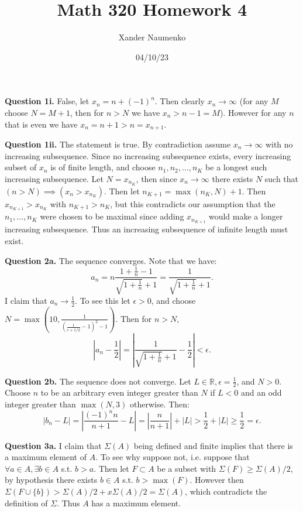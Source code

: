 \documentclass[letterpaper, reqno,11pt]{article}
\begin{document}
\title{Math 320 Homework 4}
\date{04/10/23}
\author{Xander Naumenko}
\maketitle

{\medskip\noindent\bf Question 1i.} False, let $x_n=n+(-1)^{n}$. Then clearly $x_n\to\infty$ (for any $M$ choose $N=M+1$, then for $n>N$ we have $x_n>n-1=M$). However for any $n$ that is even we have $x_n=n+1>n=x_{n+1}$.

{\medskip\noindent\bf Question 1ii.} The statement is true. By contradiction assume $x_n\to \infty$ with no increasing subsequence. Since no increasing subsequence exists, every increasing subset of $x_n$ is of finite length, and choose $n_1,n_2,\ldots,n_K$ be a longest such increasing subsequence. Let $N=x_{n_K}$, then since $x_n\to\infty$ there exists $N$ such that $(n>N)\implies\left( x_n>x_{n_K} \right) $. Then let $n_{K+1}=\max(n_K,N)+1$. Then $x_{n_{K+1}}>x_{n_K}$ with $n_{K+1}>n_K$, but this contradicts our assumption that the $n_1,\ldots,n_K$ were chosen to be maximal since adding $x_{n_{K+1}}$ would make a longer increasing subsequence. Thus an increasing subsequence of infinite length must exist.

\newpage\phantom{blabla}
\newpage

{\medskip\noindent\bf Question 2a.} The sequence converges. Note that we have:
\[
a_{n}=n \frac{1+\frac{1}{n}-1}{\sqrt{1+\frac{1}{n}}+1}=\frac{1}{\sqrt{1+\frac{1}{n}}+1}
.\]
I claim that $a_n\to \frac{1}{2}$. To see this let $\epsilon>0$, and choose $N=\max\left(10,\frac{1}{\left( \frac{1}{\epsilon+1 /2}-1 \right) ^2-1}\right)$. Then for $n>N$,
\[
|a_n-\frac{1}{2}|=\left| \frac{1}{\sqrt{1+\frac{1}{n}}+1} -\frac{1}{2}\right|<\epsilon
.\]

{\medskip\noindent\bf Question 2b.} The sequence does not converge. Let $L\in \mathbb{R},\epsilon=\frac{1}{2}$, and $N>0$. Choose $n$ to be an arbitrary even integer greater than $N$ if $L<0$ and an odd integer greater than $\max(N, 3)$ otherwise. Then:
\[
\left| b_n-L \right| =\left| \frac{(-1)^{n}n}{n+1}-L \right|=\left| \frac{n}{n+1} \right| +|L|> \frac{1}{2}+|L|\geq \frac{1}{2}=\epsilon
.\]

\newpage\phantom{blabla}
\newpage

{\medskip\noindent\bf Question 3a.} I claim that $\Sigma(A)$ being defined and finite implies that there is a maximum element of $A$. To see why suppose not, i.e. suppose that $\forall a\in A, \exists b\in A$ s.t. $b>a$. Then let $F\subset A$ be a subset with $\Sigma(F)\geq \Sigma(A) /2$, by hypothesis there exists $b\in A$ s.t. $b>\max(F)$. However then $\Sigma(F\cup \{b\})> \Sigma(A) /2+x\Sigma(A) /2=\Sigma(A)$, which contradicts the definition of $\Sigma$. Thus $A$ has a maximum element.
\end{document}
